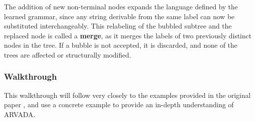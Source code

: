 \vspace{\baselineskip}
The addition of new non-terminal nodes expands the language defined by the learned grammar, since any string derivable from the same label can now be substituted interchangeably. This relabeling of the bubbled subtree and the replaced node is called a \textbf{merge}, as it merges the labels of two previously distinct nodes in the tree. If a bubble is not accepted, it is discarded, and none of the trees are affected or structurally modified.

\subsubsection{Walkthrough}

This walkthrough will follow very closely to the examples provided in the original paper \cite{kulkarniLearningHighlyRecursive2021}, and use a concrete example to provide an in-depth understanding of ARVADA.

